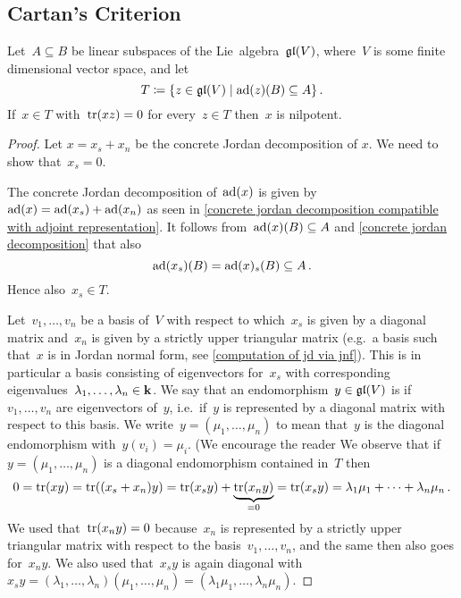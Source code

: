 \subsection{Cartan’s Criterion}


\begin{lemma}
  \label{cartans criterion technical lemma}
  Let~$A \subseteq B$ be linear subspaces of the Lie~algebra~$\mathfrak{gl}(V)$, where~$V$ is some finite dimensional vector space, and let
  \[
    T
    \defined
    \{
      z \in \gllie(V)
    \suchthat
      \ad(z)(B) \subseteq A
    \}  \,.
  \]
  If~$x \in T$ with~$\operatorname{tr}(xz) = 0$ for every~$z \in T$ then~$x$ is nilpotent.
\end{lemma}
% 
\begin{proof}
  Let $x = x_s + x_n$ be the concrete Jordan decomposition of $x$.
  We need to show that~$x_s = 0$.
  
  The concrete Jordan decomposition of~$\operatorname{ad}(x)$ is given by~$\operatorname{ad}(x) = \operatorname{ad}(x_s) + \operatorname{ad}(x_n)$ as seen in \cref{concrete jordan decomposition compatible with adjoint representation}.
  It follows from~$\operatorname{ad}(x)(B) \subseteq A$ and \cref{concrete jordan decomposition} that also
  \[
    \operatorname{ad}(x_s)(B)
    =
    \operatorname{ad}(x)_s(B)
    \subseteq
    A \,.
  \]
  Hence also~$x_s \in T$.
  
  Let~$v_1, \dotsc, v_n$ be a basis of~$V$ with respect to which~$x_s$ is given by a diagonal matrix and~$x_n$ is given by a strictly upper triangular matrix (e.g.\ a basis such that~$x$ is in Jordan normal form, see \cref{computation of jd via jnf}).
  This is in particular a basis consisting of eigenvectors for~$x_s$ with corresponding eigenvalues~$\lambda_1, \dotsc, \lambda_n \in \mathbf{k}$.
  We say that an endomorphism~$y \in \mathfrak{gl}(V)$ is  if~$v_1, \dotsc, v_n$ are eigenvectors of~$y$, i.e.\ if~$y$ is represented by a diagonal matrix with respect to this basis.
  We write~$y = (\mu_1, \dotsc, \mu_n)$ to mean that~$y$ is the diagonal endomorphism with~$y(v_i) = \mu_i$.
  (We encourage the reader
  We observe that if~$y = (\mu_1, \dotsc, \mu_n)$ is a diagonal endomorphism contained in~$T$ then
  \[
    0
    =
    \operatorname{tr}(xy)
    =
    \operatorname{tr}((x_s + x_n)y)
    =
    \operatorname{tr}(x_s y) + \underbrace{\operatorname{tr}(x_n y)}_{=0}
    =
    \operatorname{tr}(x_s y)
    =
    \lambda_1 \mu_1 + \dotsb + \lambda_n \mu_n  \,.
  \]
  We used that~$\operatorname{tr}(x_n y) = 0$ because~$x_n$ is represented by a strictly upper triangular matrix with respect to the basis~$v_1, \dotsc, v_n$, and the same then also goes for~$x_n y$.
  We also used that~$x_s y$ is again diagonal with~$x_s y = (\lambda_1, \dotsc, \lambda_n)(\mu_1, \dotsc, \mu_n) = (\lambda_1 \mu_1, \dotsc, \lambda_n \mu_n)$.
  

\end{proof}
